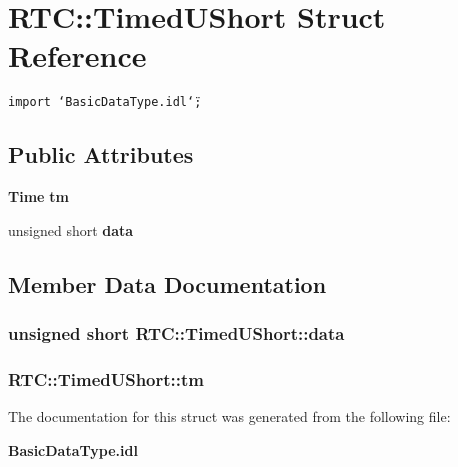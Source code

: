 \section{RTC::Timed\-UShort Struct Reference}
\label{structRTC_1_1TimedUShort}
{\tt import \char`\"{}Basic\-Data\-Type.idl\char`\"{};}

\subsection*{Public Attributes}
\begin{CompactItemize}
\item 
{\bf Time} {\bf tm}
\item 
unsigned short {\bf data}
\end{CompactItemize}


\subsection{Member Data Documentation}
\subsubsection{\setlength{\rightskip}{0pt plus 5cm}unsigned short {\bf RTC::Timed\-UShort::data}}\label{structRTC_1_1TimedUShort_RTC_1_1TimedUShorto1}


\subsubsection{ {\bf RTC::Timed\-UShort::tm}}\label{structRTC_1_1TimedUShort_RTC_1_1TimedUShorto0}




The documentation for this struct was generated from the following file:\begin{CompactItemize}
\item 
{\bf Basic\-Data\-Type.idl}\end{CompactItemize}
